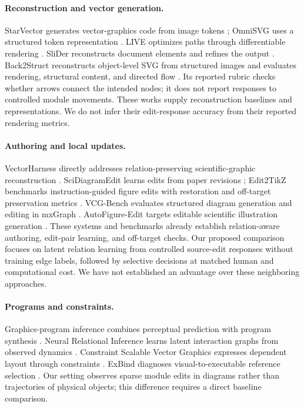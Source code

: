 \documentclass{article}
\begin{document}
\paragraph{Reconstruction and vector generation.}
StarVector generates vector-graphics code from image tokens \citep{rodriguez2025starvector}; OmniSVG uses a structured token representation \citep{yang2025omnisvg}. LIVE optimizes paths through differentiable rendering \citep{ma2022live}. SliDer reconstructs document elements and refines the output \citep{hazimeh2026slider}. Back2Struct reconstructs object-level SVG from structured images and evaluates rendering, structural content, and directed flow \citep{yan2026back2struct}. Its reported rubric checks whether arrows connect the intended nodes; it does not report responses to controlled module movements. These works supply reconstruction baselines and representations. We do not infer their edit-response accuracy from their reported rendering metrics.

\paragraph{Authoring and local updates.}
VectorHarness directly addresses relation-preserving scientific-graphic reconstruction \citep{tang2026vectorharness}. SciDiagramEdit learns edits from paper revisions \citep{sun2026scidiagramedit}; Edit2TikZ benchmarks instruction-guided figure edits with restoration and off-target preservation metrics \citep{zhang2026edit2tikz}. VCG-Bench evaluates structured diagram generation and editing in mxGraph \citep{su2026vcgbench}. AutoFigure-Edit targets editable scientific illustration generation \citep{lin2026autofigureedit}. These systems and benchmarks already establish relation-aware authoring, edit-pair learning, and off-target checks. Our proposed comparison focuses on latent relation learning from controlled source-edit responses without training edge labels, followed by selective decisions at matched human and computational cost. We have not established an advantage over these neighboring approaches.

\paragraph{Programs and constraints.}
Graphics-program inference combines perceptual prediction with program synthesis \citep{ellis2018graphics}. Neural Relational Inference learns latent interaction graphs from observed dynamics \citep{kipf2018nri}. Constraint Scalable Vector Graphics expresses dependent layout through constraints \citep{badros2001constraint}. ExBind diagnoses visual-to-executable reference selection \citep{wang2026exbind}. Our setting observes sparse module edits in diagrams rather than trajectories of physical objects; this difference requires a direct baseline comparison.
\end{document}
